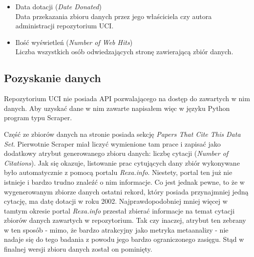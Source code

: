 \begin{itemize}
  \item Data dotacji (\emph{Date Donated}) \\
        Data przekazania zbioru danych przez jego właściciela czy autora administracji repozytorium UCI.

  \item Ilość wyświetleń (\emph{Number of Web Hits}) \\
        Liczba wszystkich osób odwiedzających stronę zawierającą zbiór danych.

\end{itemize}

\subsection{Pozyskanie danych}

Repozytorium UCI nie posiada API pozwalającego na dostęp do zawartych w nim danych.
Aby uzyskać dane w nim zawarte napisałem więc w języku Python program typu Scraper.

Część ze zbiorów danych na stronie posiada sekcję \emph{Papers That Cite This Data Set}.
Pierwotnie Scraper miał liczyć wymienione tam prace i zapisać jako dodatkowy atrybut generowanego zbioru danych: liczbę cytacji (\emph{Number of Citations}).
Jak się okazuje, listowanie prac cytujących dany zbiór wykonywane było automatycznie z pomocą portalu \emph{Rexa.info}.
Niestety, portal ten już nie istnieje i bardzo trudno znaleźć o nim informacje.
Co jest jednak pewne, to że w wygenerowanym zbiorze danych ostatni rekord, który posiada przynajmniej jedną cytację, ma datę dotacji w roku 2002.
Najprawdopodobniej mniej więcej w tamtym okresie portal \emph{Rexa.info} przestał zbierać informacje na temat cytacji zbiorów danych zawartych w repozytorium.
Tak czy inaczej, atrybut ten zebrany w ten sposób - mimo, że bardzo atrakcyjny jako metryka metaanalizy - nie nadaje się do tego badania z powodu jego bardzo ograniczonego zasięgu.
Stąd w finalnej wersji zbioru danych został on pominięty.


